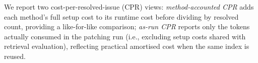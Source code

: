 We report two cost-per-resolved-issue (CPR) views: \emph{method-accounted CPR} adds each method's full setup cost to its runtime cost before dividing by resolved count, providing a like-for-like comparison; \emph{as-run CPR} reports only the tokens actually consumed in the patching run (i.e., excluding setup costs shared with retrieval evaluation), reflecting practical amortised cost when the same index is reused.
